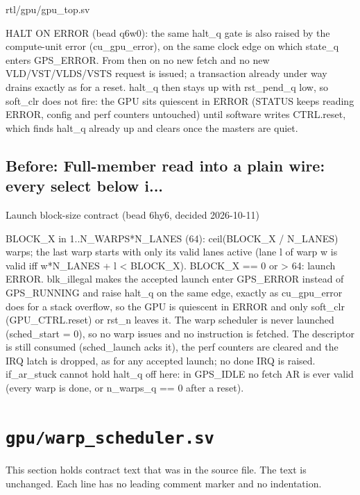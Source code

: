 \begin{relocated}{rtl/gpu/gpu_top.sv}
\begin{textblock}
HALT ON ERROR (bead q6w0): the same halt_q gate is also raised by the
compute-unit error (cu_gpu_error), on the same clock edge on which state_q
enters GPS_ERROR.  From then on no new fetch and no new VLD/VST/VLDS/VSTS
request is issued; a transaction already under way drains exactly as for
a reset.  halt_q then stays up with rst_pend_q low, so soft_clr does not
fire: the GPU sits quiescent in ERROR (STATUS keeps reading ERROR, config
and perf counters untouched) until software writes CTRL.reset, which finds
halt_q already up and clears once the masters are quiet.
\end{textblock}

\subsection*{Before: Full-member read into a plain wire: every select below i...}

\begin{textblock}
Launch block-size contract (bead 6hy6, decided 2026-10-11)

  BLOCK_X in 1..N_WARPS*N_LANES (64): ceil(BLOCK_X / N_LANES) warps; the last warp starts
    with only its valid lanes active (lane l of warp w is valid iff w*N_LANES + l < BLOCK_X).
  BLOCK_X == 0 or > 64: launch ERROR.  blk_illegal makes the accepted launch enter
    GPS_ERROR instead of GPS_RUNNING and raise halt_q on the same edge, exactly as
    cu_gpu_error does for a stack overflow, so the GPU is quiescent in ERROR and only
    soft_clr (GPU_CTRL.reset) or rst_n leaves it.  The warp scheduler is never launched
    (sched_start = 0), so no warp issues and no instruction is fetched.  The descriptor
    is still consumed (sched_launch acks it), the perf counters are cleared and the IRQ
    latch is dropped, as for any accepted launch; no done IRQ is raised.
    if_ar_stuck cannot hold halt_q off here: in GPS_IDLE no fetch AR is ever valid
    (every warp is done, or n_warps_q == 0 after a reset).
\end{textblock}

\end{relocated}

\section{\texttt{gpu/warp\_scheduler.sv}}\label{ds:mod:warp-scheduler}

This section holds contract text that was in the source file. The text is unchanged. Each line has no leading comment marker and no indentation.

